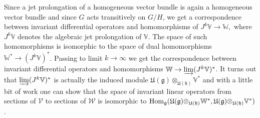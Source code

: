 \documentclass[12pt,a4paper,final]{report}
\begin{document}
Since a jet prolongation of a homogeneous vector bundle is again a homogeneous vector bundle and since $G$ acts transitively on $G/H$, we get a correspondence between invariant differential operators and homomorphisms of $J^k \mathbb{V} \to \mathbb{W},$ where  $J^k \mathbb{V}$ denotes the algebraic jet prolongation of $\mathbb{V}.$  The space of such homomorphisms is isomorphic to the space of dual homomorphisms $\mathbb{W}^* \to (J^k\mathbb{V})^* $. Passing to limit $k \to \infty$ we get the correspondence between invariant differential operators and homomorphisms $\mathbb{W} \to  \varinjlim  (J^k\mathbb{V})^* $. It turns out that $\varinjlim  (J^k\mathbb{V})^*$ is actually the induced module $\mathfrak{U(g)\otimes_{U(h)}} \mathbb{V}^*$  and with a little bit of work one can show that the space of invariant linear operators from sections of $\mathcal{V}$ to sections of $\mathcal{W}$  is isomorphic to $\mathrm{Hom}_{\mathfrak{g}}(\mathfrak{U(g)\otimes_{U(h)}}\mathbb{W}^*, \mathfrak{U(g)\otimes_{U(h)}}\mathbb{V}^*)$.
\end{document}

